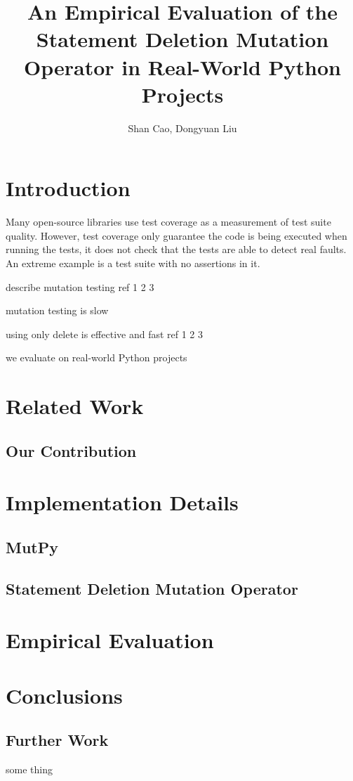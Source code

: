 \documentclass{article}
\title{\textbf{An Empirical Evaluation of the Statement Deletion Mutation Operator in Real-World Python Projects}}
\author{Shan Cao, Dongyuan Liu}
\begin{document}
\maketitle
\tableofcontents

\section{Introduction}

Many open-source libraries use test coverage as a measurement of test suite quality. However, test coverage only guarantee the code is being executed when running the tests, it does not check that the tests are able to detect real faults. An extreme example is a test suite with no assertions in it.

describe mutation testing ref 1 2 3

mutation testing is slow

using only delete is effective and fast ref 1 2 3

we evaluate on real-world Python projects

\section{Related Work}

\subsection{Our Contribution}

\section{Implementation Details}

\subsection{MutPy}

\subsection{Statement Deletion Mutation Operator}

\section{Empirical Evaluation}

\section{Conclusions}

\subsection{Further Work}
some thing

\begin{appendices}
\end{appendices}


\end{document}
